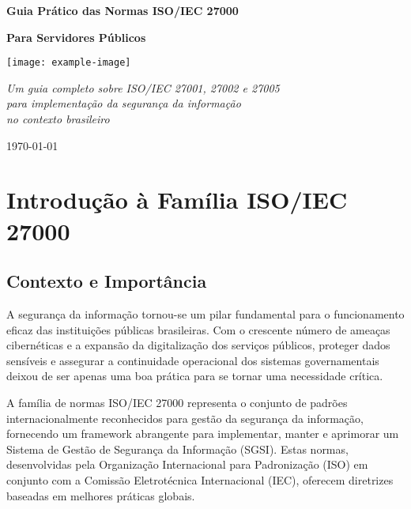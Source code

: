 \documentclass[12pt,a4paper]{report}
\begin{document}
\begin{titlepage}
    \centering
    \vspace*{1cm}
    {\Huge\bfseries\color{titlecolor} Guia Prático das Normas ISO/IEC 27000\par}
    \vspace{1.5cm}
    {\LARGE\textbf{Para Servidores Públicos}\par}
    \vspace{2cm}
    
    \texttt{[image: example-image]} %
    
    \vspace{2cm}
    {\Large\textit{Um guia completo sobre ISO/IEC 27001, 27002 e 27005\\
    para implementação da segurança da informação\\
    no contexto brasileiro}\par}
    
    \vfill
    {\large \today\par}
\end{titlepage}

\tableofcontents
\clearpage

\chapter{Introdução à Família ISO/IEC 27000}

\section{Contexto e Importância}

A segurança da informação tornou-se um pilar fundamental para o funcionamento eficaz das instituições públicas brasileiras. Com o crescente número de ameaças cibernéticas e a expansão da digitalização dos serviços públicos, proteger dados sensíveis e assegurar a continuidade operacional dos sistemas governamentais deixou de ser apenas uma boa prática para se tornar uma necessidade crítica.

A família de normas ISO/IEC 27000 representa o conjunto de padrões internacionalmente reconhecidos para gestão da segurança da informação, fornecendo um framework abrangente para implementar, manter e aprimorar um Sistema de Gestão de Segurança da Informação (SGSI). Estas normas, desenvolvidas pela Organização Internacional para Padronização (ISO) em conjunto com a Comissão Eletrotécnica Internacional (IEC), oferecem diretrizes baseadas em melhores práticas globais.
\end{document}
